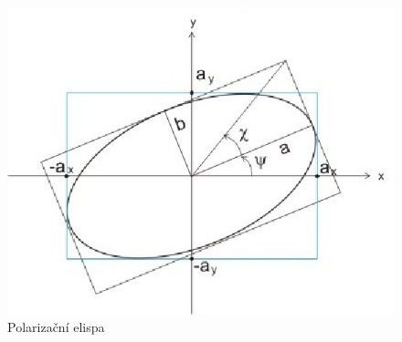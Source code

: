 \begin{figure}
\begin{center}
\includegraphics[width=5in]{img/polarelip.eps}
\caption{Polarizační elispa}
\label{polarizacni elipsa}
\end{center}
\end{figure}

